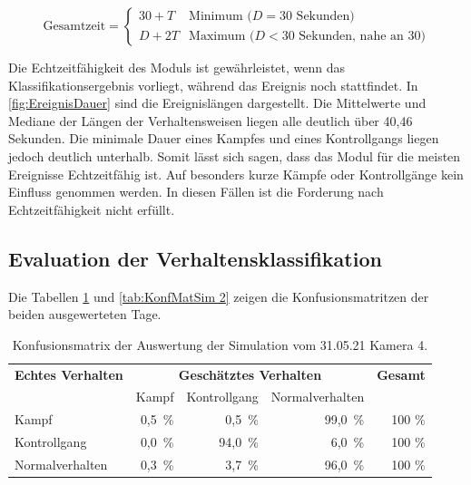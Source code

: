 \begin{equation}
    \label{eq:deltTErkenn}
    \text{Gesamtzeit} = 
    \begin{cases} 
    30 + T & \text{Minimum (} D = 30 \text{ Sekunden)} \\
    D + 2T & \text{Maximum (} D < 30 \text{ Sekunden, nahe an 30)}
    \end{cases}
\end{equation}

 Die Echtzeitfähigkeit des Moduls ist gewährleistet, wenn das Klassifikationsergebnis vorliegt, während das Ereignis noch stattfindet. In \autoref{fig:EreignisDauer} sind die Ereignislängen dargestellt. Die Mittelwerte und Mediane der Längen der Verhaltensweisen liegen alle deutlich über 40,46 Sekunden. Die minimale Dauer eines Kampfes und eines Kontrollgangs liegen jedoch deutlich unterhalb. Somit lässt sich sagen, dass das Modul für die meisten Ereignisse Echtzeitfähig ist. Auf besonders kurze Kämpfe oder Kontrollgänge kein Einfluss genommen werden. In diesen Fällen ist die Forderung nach Echtzeitfähigkeit nicht erfüllt.


\subsection{Evaluation der Verhaltensklassifikation}
Die Tabellen \ref{tab:KonfMatSim 1} und \ref{tab:KonfMatSim 2} zeigen die Konfusionsmatritzen der beiden ausgewerteten Tage. 

\begin{table}[htbp]
    \centering
    \caption{Konfusionsmatrix der Auswertung der Simulation vom 31.05.21 Kamera 4.}
    \label{tab:KonfMatSim 1}
    \begin{tabular}{l|rrr|r}
        \toprule
        \multirow{1}{*}{\textbf{Echtes Verhalten}} & \multicolumn{3}{c|}{\textbf{Geschätztes Verhalten}} & {\textbf{Gesamt}}\\
         & Kampf & Kontrollgang & Normalverhalten & \\
        \midrule
        Kampf                & 0,5\, \% &  0,5\, \% & 99,0\, \% & 100 \%\\
        Kontrollgang         & 0,0\, \% & 94,0\, \% &  6,0\, \% & 100 \%\\
        Normalverhalten      & 0,3\, \% &  3,7\, \% & 96,0\, \% & 100 \%\\
        \bottomrule
    \end{tabular}
\end{table}

